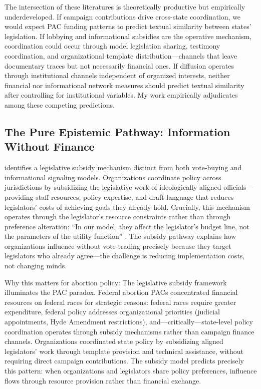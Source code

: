 The intersection of these literatures is theoretically productive but empirically underdeveloped. If campaign contributions drive cross-state coordination, we would expect PAC funding patterns to predict textual similarity between states' legislation. If lobbying and informational subsidies are the operative mechanism, coordination could occur through model legislation sharing, testimony coordination, and organizational template distribution---channels that leave documentary traces but not necessarily financial ones. If diffusion operates through institutional channels independent of organized interests, neither financial nor informational network measures should predict textual similarity after controlling for institutional variables. My work empirically adjudicates among these competing predictions.

\subsection{The Pure Epistemic Pathway: Information Without Finance}
\label{pureepistemic}

\textcite{hallLobbyingLegislativeSubsidy2006a} identifies a legislative subsidy mechanism distinct from both vote-buying and informational signaling models. Organizations coordinate policy across jurisdictions by subsidizing the legislative work of ideologically aligned officials---providing staff resources, policy expertise, and draft language that reduces legislators' costs of achieving goals they already hold. Crucially, this mechanism operates through the legislator's resource constraints rather than through preference alteration: ``In our model, they affect the legislator's budget line, not the parameters of the utility function'' \parencite[p.70]{hallLobbyingLegislativeSubsidy2006a}. The subsidy pathway explains how organizations influence without vote-trading precisely because they target legislators who already agree---the challenge is reducing implementation costs, not changing minds.

Why this matters for abortion policy: The legislative subsidy framework illuminates the PAC paradox. Federal abortion PACs concentrated financial resources on federal races for strategic reasons: federal races require greater expenditure, federal policy addresses organizational priorities (judicial appointments, Hyde Amendment restrictions), and---critically---state-level policy coordination operates through subsidy mechanisms rather than campaign finance channels. Organizations coordinated state policy by subsidizing aligned legislators' work through template provision and technical assistance, without requiring direct campaign contributions. The subsidy model predicts precisely this pattern: when organizations and legislators share policy preferences, influence flows through resource provision rather than financial exchange.

